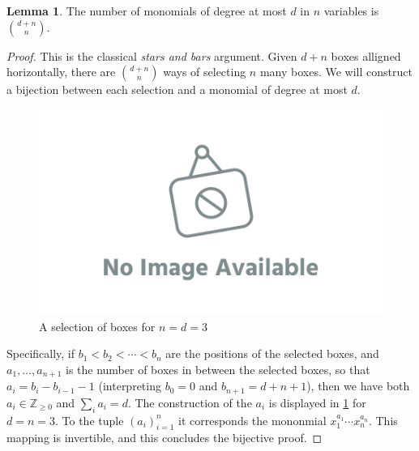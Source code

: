 \documentclass[12pt]{amsart}
\theoremstyle{definition}
\newtheorem{lm}[thm]{Lemma}
\newcommand{\Z}{\mathbb{Z}}
\begin{document}
\begin{lm}\label{lm:monomialcount}
The number of monomials of degree at most $d$ in $n$ variables is $\binom{d+n}{n}$.
\end{lm}

\begin{proof}
This is the classical \textit{stars and bars} argument.
Given $d+n$ boxes alligned horizontally, there are $\binom{d+n}{n}$ ways of selecting $n$ many boxes.
We will construct a bijection between each selection and a monomial of degree at most $d$.

\begin{figure}
\includegraphics[scale=.1]{../imgs/ina.png}
\caption{A selection of boxes for $n=d=3$\label{fig:starsnbars}}
\end{figure}


Specifically, if $b_1 < b_2 < \cdots < b_n$ are the positions of the selected boxes, and $a_1, \ldots, a_{n+1}$ is the number of boxes in between the selected boxes, so that $a_i = b_i - b_{i-1} - 1$ (interpreting $b_0 = 0$ and $b_{n+1} = d+n+1$), then we have both $a_i \in \Z_{\geq 0}$ and $\sum_i a_i = d$.
The construction of the $a_i$ is displayed in \cref{fig:starsnbars} for $d = n = 3$.
To the tuple $(a_i)_{i=1}^n$ it corresponds the mononmial $x_1^{a_1}\cdots x_n^{a_n}$.
This mapping is invertible, and this concludes the bijective proof.
\end{proof}
\end{document}
